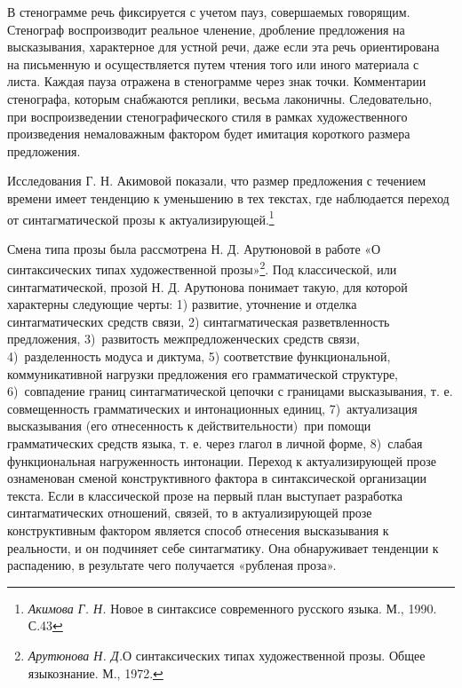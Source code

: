 \documentclass{kursa4}
\begin{document}
      В стенограмме речь фиксируется с учетом пауз, совершаемых говорящим. Стенограф воспроизводит реальное членение, дробление предложения на высказывания, характерное для устной речи, даже если эта речь ориентирована на письменную и осуществляется путем чтения того или иного материала с листа. Каждая пауза отражена в стенограмме через знак точки. Комментарии стенографа, которым снабжаются реплики, весьма лаконичны. Следовательно, при воспроизведении стенографического стиля в рамках художественного произведения немаловажным фактором будет имитация короткого размера предложения. 

      Исследования Г. Н. Акимовой показали, что размер предложения с течением времени имеет тенденцию к уменьшению в тех текстах, где наблюдается переход от синтагматической прозы к актуализирующей.\footnote{\textit{Акимова Г. Н.} Новое в синтаксисе современного русского языка. М., 1990. С.43} 

      Смена типа прозы была рассмотрена Н. Д. Арутюновой в работе «О синтаксических типах художественной прозы»\footnote{\textit{Арутюнова Н. Д.}О синтаксических типах художественной прозы. Общее языкознание. М., 1972.}. Под классической, или синтагматической, прозой Н. Д. Арутюнова понимает такую, для которой характерны следующие черты: 1) развитие, уточнение и отделка синтагматических средств связи, 2) синтагматическая разветвленность предложения, 3)~развитость межпредложенческих средств связи, 4)~разделенность модуса и диктума, 5) соответствие функциональной, коммуникативной нагрузки предложения его грамматической структуре, 6)~совпадение границ синтагматической цепочки с границами высказывания, т. е. совмещенность грамматических и интонационных единиц, 7)~актуализация высказывания (его отнесенность к действительности)~при помощи грамматических средств языка, т. е. через глагол в личной форме, 8)~слабая функциональная нагруженность интонации. Переход к актуализирующей прозе ознаменован сменой конструктивного фактора в синтаксической организации текста. Если в классической прозе на первый план выступает разработка синтагматических отношений, связей, то в актуализирующей прозе конструктивным фактором является способ отнесения высказывания к реальности, и он подчиняет себе синтагматику. Она обнаруживает тенденции к распадению, в результате чего получается «рубленая проза». 
\end{document}
